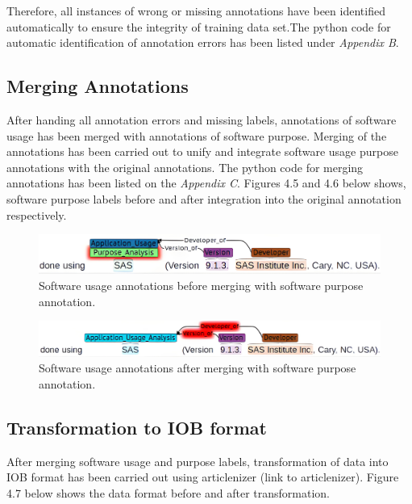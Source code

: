 Therefore, all instances of wrong or missing annotations have been identified automatically to ensure the integrity of training data set.The python code for automatic identification of annotation errors has been listed under \emph{Appendix B}.

\subsection{Merging Annotations}
\label{subsec:dataset:preprocessing:Merging}

After handing all annotation errors and missing labels, annotations of software usage has been merged with annotations of software purpose. Merging of the annotations has been carried out to unify and integrate software usage purpose annotations with the original annotations. The python code for merging annotations has been listed on the \emph{Appendix C}. Figures 4.5 and 4.6 below shows, software purpose labels before and after integration into the original annotation respectively.  \\

\begin{figure}[htbp]
	\centering
	\includegraphics[width=.75\textwidth]{4.graphics/figures/ch_4/2002515_plm_unm_HD}
	\caption{Software usage annotations before merging with software purpose  annotation.}
	
	\label{fig:chapter04:setup}
\end{figure}

\begin{figure}[htbp]
	\centering
	\includegraphics[width=.75\textwidth]{4.graphics/figures/ch_4/2002515_plm_HD}
	\caption{Software usage annotations after merging with software purpose  annotation.}
	\label{fig:chapter04:setup}
\end{figure}


\subsection{Transformation to IOB format}
\label{subsec:dataset:preprocessing:Transformation}
After merging software usage and purpose labels, transformation of data into IOB format has been carried out using articlenizer (link to articlenizer). Figure 4.7 below shows the data format before and after transformation. \\

